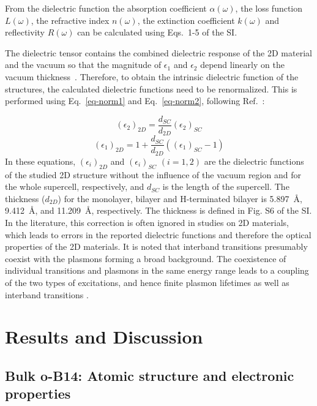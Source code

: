 \documentclass[aps,prb,preprint,notitlepage]{revtex4-2}
\begin{document}
From the dielectric function the absorption coefficient $\alpha(\omega)$, the loss function $L(\omega)$, the refractive index $n(\omega)$, the extinction coefficient $k(\omega)$ and reflectivity $R(\omega)$ can be calculated using Eqs.~1-5 of the SI.


The dielectric tensor contains the combined dielectric response 
of the 2D material and the vacuum so that the magnitude 
of $\epsilon_{1}$ and $\epsilon_{2}$ depend linearly on the vacuum thickness~\cite{Dielectric_vacuum_1,Dielectric_vacuum_2}. 
Therefore, to obtain the intrinsic dielectric function of the structures, 
the calculated dielectric functions need to be renormalized. This is performed 
using Eq.~\ref{eq-norm1} and Eq.~\ref{eq-norm2},
following Ref.~\cite{yang2021method}:


\begin{equation}
	(\epsilon_{2})_{2D} = \frac{d_{SC}}{d_{2D}}(\epsilon_{2})_{SC}
	\label{eq-norm1}
\end{equation}
\begin{equation}
	(\epsilon_{1})_{2D} = 1 + \frac{d_{SC}}{d_{2D}}((\epsilon_{1})_{SC}
	-1)
	\label{eq-norm2}
\end{equation}
In these equations, $(\epsilon_{i})_{2D}$  and
 $(\epsilon_{i})_{SC}$  $(i=1,2)$ are the dielectric functions of the studied 2D structure without the influence of the vacuum region and for the whole supercell, respectively, and $d_{SC}$ is the length of the supercell.
 The thickness ($d_{2D}$) for  the monolayer, bilayer and H-terminated bilayer is 5.897~\AA, 9.412~\AA, and 11.209~\AA, respectively. The thickness is defined in Fig. S6 of the  SI.
In the literature, this correction is often ignored in studies on 2D materials, which leads to errors in the reported dielectric functions and therefore the optical properties of the 2D materials.
It is noted that interband transitions presumably coexist with the 
plasmons forming a broad background. The coexistence of individual transitions 
and plasmons in the same energy range leads to a coupling 
of the two types of excitations, and hence finite plasmon 
lifetimes as  well as interband transitions \cite{li2017first}. 


\section{Results and Discussion}

\subsection{Bulk o-B14: Atomic structure and electronic properties}
\end{document}
